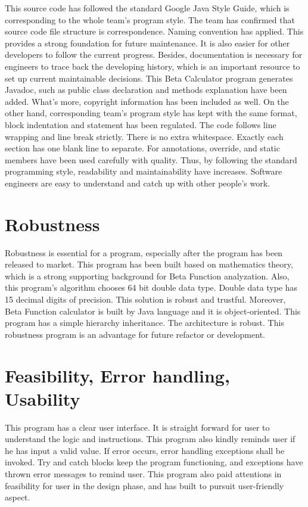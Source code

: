 \documentclass{article}
\begin{document}
This source code has followed the standard Google Java Style Guide, which is corresponding to the whole team’s program style. The team has confirmed that source code file structure is correspondence. Naming convention has applied. This provides a strong foundation for future maintenance. It is also easier for other developers to follow the current progress. Besides, documentation is necessary for engineers to trace back the developing history, which is an important resource to set up current maintainable decisions. This Beta Calculator program generates Javadoc, such as public class declaration and methods explanation have been added. What's more, copyright information has been included as well. On the other hand, corresponding team’s program style has kept with the same format, block indentation and statement has been regulated. The code follows line wrapping and line break strictly. There is no extra whitespace. Exactly each section has one blank line to separate. For annotations, override, and static members have been used carefully with quality. Thus, by following the standard programming style, readability and maintainability have increases. Software engineers are easy to understand and catch up with other people’s work. 


\section{Robustness}
Robustness is essential for a program, especially after the program has been released to market. This program has been built based on mathematics theory, which is a strong supporting background for Beta Function analyzation. Also, this program's algorithm chooses 64 bit double data type. Double data type has 15 decimal digits of precision. This solution is robust and trustful. Moreover, Beta Function calculator is built by Java language and it is object-oriented. This program has a simple hierarchy inheritance. The architecture is robust. This robustness program is an advantage for future refactor or development.


\section{Feasibility, Error handling, Usability}


This program has a clear user interface. It is straight forward for user to understand the logic and instructions. This program also kindly reminds user if he has input a valid value. If error occurs, error handling exceptions shall be invoked. Try and catch blocks keep the program functioning, and exceptions have thrown error messages to remind user. This program also paid attentions in feasibility for user in the design phase, and has built to pursuit user-friendly aspect.
\end{document}
